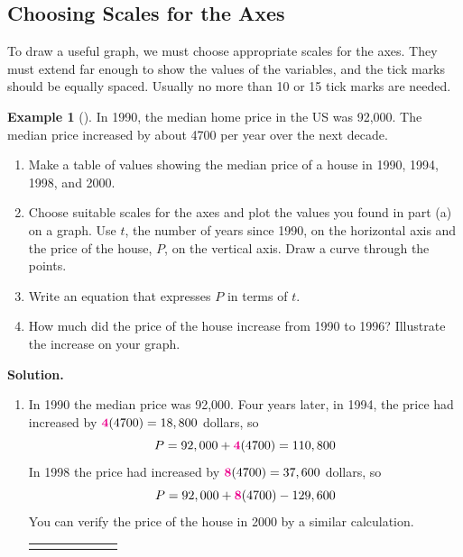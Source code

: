 \documentclass[10pt,]{book}
\theoremstyle{plain}
\theoremstyle{definition}
\theoremstyle{definition}
\newtheorem{example}[theorem]{Example}
\theoremstyle{definition}
\numberwithin{equation}{part}
\newcommand{\hrulethick} {\noalign{\hrule height 0.11em}}
\newcommand{\alert}[1]{\boldsymbol{\color{magenta}{#1}}}
\begin{document}
\subsection[{Choosing Scales for the Axes}]{Choosing Scales for the Axes}\label{subsection-2}
To draw a useful graph, we must choose appropriate scales for the axes.  They must extend far enough to show the values of the variables, and the tick marks should be equally spaced.  Usually no more than 10 or 15 tick marks are needed.%
\begin{example}[]\label{example-home-price}
In 1990, the median home price in the US was \textdollar{}92,000.  The median price increased by about \textdollar{}4700 per year over the next decade. \leavevmode%
\begin{enumerate}[label=\alph*]
\item\hypertarget{li-22}{}Make a table of values showing the median price of a house in 1990, 1994, 1998, and 2000.%
\item\hypertarget{li-23}{}Choose suitable scales for the axes and plot the values you found in part (a) on a graph. Use \(t\), the number of years since 1990, on the horizontal axis and the price of the house, \(P\), on the vertical axis.  Draw a curve through the points.%
\item\hypertarget{li-24}{}Write an equation that expresses \(P\) in terms of \(t\).%
\item\hypertarget{li-25}{}How much did the price of the house increase from 1990 to 1996?  Illustrate the increase on your graph.%
\end{enumerate}
%
\par\medskip\noindent%
\textbf{Solution.}\quad \leavevmode%
\begin{enumerate}[label=\alph*]
\item\hypertarget{li-26}{}In 1990 the median price was \textdollar{}92,000.  Four years later, in 1994, the price had increased by \(\alert{4}(4700)=18,800\) dollars, so%
\begin{equation*}
P=92,000+\alert{4}(4700)=110,800
\end{equation*}
In 1998 the price had increased by \(\alert{8}(4700)=37,600\)  dollars, so%
\begin{equation*}
P=92,000+\alert{8}(4700)-129,600
\end{equation*}
You can verify the price of the house in 2000 by a similar calculation.%
\leavevmode%
\begin{table}
\centering
\begin{tabular}{AcAcAcA}\hrulethick

\end{tabular}
\end{table}
\end{enumerate}
\end{example}
\end{document}
